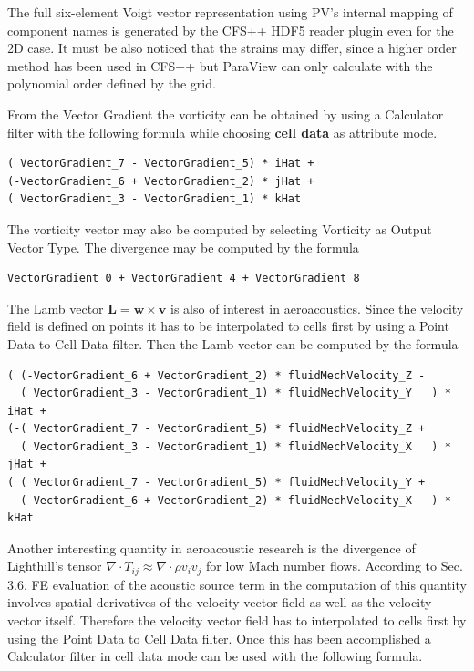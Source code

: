 The full six-element Voigt vector representation using PV's internal mapping of component names is generated by the CFS++ HDF5 reader plugin even for the 2D case. It must be also noticed that the strains may differ, since a higher order method has been used in CFS++ but ParaView can only calculate with the polynomial order defined by the grid.

From the Vector  Gradient the vorticity can be obtained  by using a Calculator
filter with the following formula while choosing {\bf cell data} as attribute mode.

\begin{verbatim}
( VectorGradient_7 - VectorGradient_5) * iHat +
(-VectorGradient_6 + VectorGradient_2) * jHat +
( VectorGradient_3 - VectorGradient_1) * kHat
\end{verbatim}

The vorticity vector may also be computed by selecting Vorticity as Output Vector Type. The divergence may be computed by the formula
\begin{verbatim}
VectorGradient_0 + VectorGradient_4 + VectorGradient_8
\end{verbatim}

The  Lamb  vector $\mathbf{L}  =  \mathbf{w}  \times  \mathbf{v}$ is  also  of
interest in  aeroacoustics. Since the velocity  field is defined  on points it
has to  be interpolated  to cells  first by using  a Point  Data to  Cell Data
filter. Then the Lamb vector can be computed by the formula

\begin{verbatim}
( (-VectorGradient_6 + VectorGradient_2) * fluidMechVelocity_Z -
  ( VectorGradient_3 - VectorGradient_1) * fluidMechVelocity_Y   ) * iHat +
(-( VectorGradient_7 - VectorGradient_5) * fluidMechVelocity_Z + 
  ( VectorGradient_3 - VectorGradient_1) * fluidMechVelocity_X   ) * jHat +
( ( VectorGradient_7 - VectorGradient_5) * fluidMechVelocity_Y + 
  (-VectorGradient_6 + VectorGradient_2) * fluidMechVelocity_X   ) * kHat
\end{verbatim}

Another  interesting quantity in  aeroacoustic research  is the  divergence of
Lighthill's tensor $\nabla \cdot T_{ij} \approx \nabla \cdot \rho v_i v_j$ for
low Mach number  flows.  According to Sec.  3.6. FE  evaluation of the acoustic
source term  in \cite{Escobar2007} the  computation of this  quantity involves
spatial  derivatives of  the velocity  vector field  as well  as  the velocity
vector itself.   Therefore the  velocity vector field  has to  interpolated to
cells first by  using the Point Data  to Cell Data filter. Once  this has been
accomplished  a Calculator  filter in  cell  data mode  can be  used with  the
following formula.

